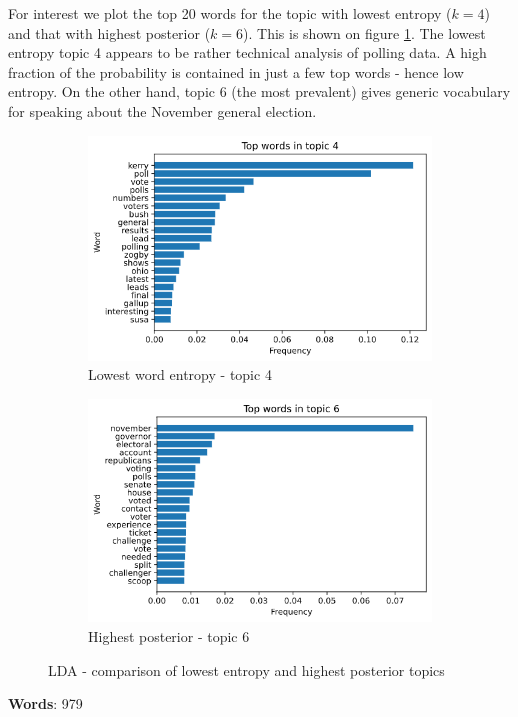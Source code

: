 \documentclass[]{article}
\begin{document}
For interest we plot the top 20 words for the topic with lowest entropy ($k=4$) and that with highest posterior ($k=6$). This is shown on figure \ref{fig:top-topics}. The lowest entropy topic 4 appears to be rather technical analysis of polling data. A high fraction of the probability is contained in just a few top words - hence low entropy. On the other hand, topic 6 (the most prevalent) gives generic vocabulary for speaking about the November general election.
%
\begin{figure}[!h]
	\begin{subfigure}{0.5\linewidth}
		\centering
		\includegraphics[width=\linewidth]{topic-4-words.png}
		\caption{Lowest word entropy - topic 4}	
	\end{subfigure}
	\begin{subfigure}{0.5\linewidth}
		\centering
		\includegraphics[width=\linewidth]{topic-6-words.png}
		\caption{Highest posterior - topic 6}
	\end{subfigure}
	\caption{LDA - comparison of lowest entropy and highest posterior topics}
	\label{fig:top-topics}
\end{figure}

\textbf{Words}: 979
\end{document}
